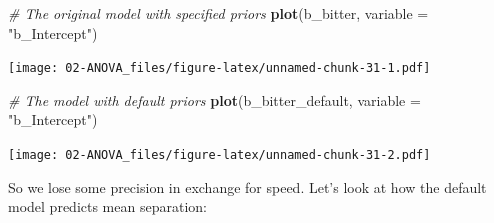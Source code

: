 \documentclass[
]{book}
\newenvironment{Shaded}{\begin{snugshade}}{\end{snugshade}}
\newcommand{\AttributeTok}[1]{\textcolor[rgb]{0.13,0.29,0.53}{#1}}
\newcommand{\CommentTok}[1]{\textcolor[rgb]{0.56,0.35,0.01}{\textit{#1}}}
\newcommand{\FunctionTok}[1]{\textcolor[rgb]{0.13,0.29,0.53}{\textbf{#1}}}
\newcommand{\NormalTok}[1]{#1}
\newcommand{\StringTok}[1]{\textcolor[rgb]{0.31,0.60,0.02}{#1}}
\begin{document}
\begin{Shaded}
\begin{Highlighting}[]
\CommentTok{\# The original model with specified priors}
\FunctionTok{plot}\NormalTok{(b\_bitter, }\AttributeTok{variable =} \StringTok{"b\_Intercept"}\NormalTok{)}
\end{Highlighting}
\end{Shaded}

\texttt{[image: 02-ANOVA\_files/figure-latex/unnamed-chunk-31-1.pdf]}

\begin{Shaded}
\begin{Highlighting}[]
\CommentTok{\# The model with default priors}
\FunctionTok{plot}\NormalTok{(b\_bitter\_default, }\AttributeTok{variable =} \StringTok{"b\_Intercept"}\NormalTok{)}
\end{Highlighting}
\end{Shaded}

\texttt{[image: 02-ANOVA\_files/figure-latex/unnamed-chunk-31-2.pdf]}

So we lose some precision in exchange for speed. Let's look at how the default model predicts mean separation:
\end{document}
